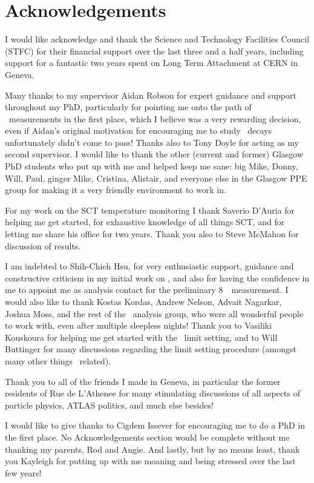\chapter*{Acknowledgements}
I would like acknowledge and thank the Science and Technology Facilities Council
(STFC) for their financial support over the last three and a half years,
including support for a fantastic two years spent on Long Term Attachment at CERN
in Geneva.

Many thanks to my supervisor Aidan Robson for expert guidance and support throughout my
PhD, particularly for pointing me onto the path of \ZZ\ measurements in the first
place, which I believe was a very rewarding decision, even if Aidan's original
motivation for encouraging me to study \ZZ\ decays unfortunately didn't come to
pass! 
Thanks also to Tony
Doyle for acting as my second supervisor.
I would like to thank the other (current and former) Glasgow PhD students who put up with me and
helped keep me sane: big Mike, Donny, Will, Paul, ginger Mike, Cristina,
Alistair, and everyone else in the Glasgow PPE group for making it a very
friendly environment to work in.

For my work on the SCT temperature monitoring I thank Saverio D'Auria
for helping me get started, for exhaustive knowledge of all things SCT, and for
letting me share his office for two years. Thank you also to Steve McMahon for
discussion of results.

I am indebted to Shih-Chieh Hsu, for very enthusiastic
support, guidance and constructive criticism in my initial work on \ZZ, and
also for having the confidence in me to appoint me as analysis contact for the
preliminary 8~\tev\ measurement. I would also like to thank Kostas Kordas,
Andrew Nelson, Advait Nagarkar, Joshua Moss, and the rest of the \ZZ\ analysis
group, who were all wonderful people to work with, even after multiple sleepless
nights! Thank you to Vasiliki Kouskoura for helping me get started with the
\TGC\ limit setting, and to Will Buttinger for many discussions regarding the
limit setting procedure (amongst many other things \ZZ\ related).

Thank you to all of the friends I made in Geneva, in particular the former
residents of Rue de L'Athenee for many stimulating discussions of all aspects of
particle physics, ATLAS politics, and much else besides!

I would like to give thanks to Cigdem Issever for encouraging me to do a PhD in the first
place. No Acknowledgements section would be complete without me
thanking my parents, Rod and Angie. And lastly, but by no means least, thank you Kayleigh for putting up with
me moaning and being stressed over the last few years!
